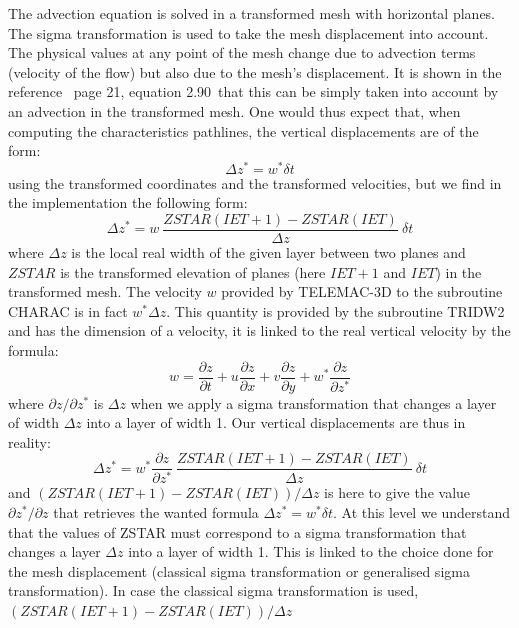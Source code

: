 The advection equation is solved in a transformed mesh with horizontal planes. The sigma
transformation is used to take the mesh displacement into account. 
The physical values at any point of the mesh change due to
advection terms (velocity of the flow) but also due to the mesh's displacement.
It is shown in the reference \cite{hervouet007}\ page 21, equation 2.90\ that this can
be simply taken into account by an advection in the transformed mesh. One
would thus expect that, when computing the characteristics pathlines,
the vertical displacements are of the form:%
\begin{equation}
\Delta z^{\ast}=w^{\ast}\delta t
\end{equation}
using the transformed coordinates and the transformed velocities, but we find
in the implementation the following form:
\begin{equation}
\Delta z^{\ast}=w~\dfrac{ZSTAR(IET+1)-ZSTAR(IET)}{\Delta z}~\delta t
\end{equation}
where $\Delta z$ is the local real width of the given layer between two planes
and $ZSTAR$ is the transformed elevation of planes (here $IET+1$ and $IET$) in
the transformed mesh.
The velocity $w$ provided by TELEMAC-3D to the subroutine CHARAC is in
fact $w^{\ast}\Delta z$. This quantity is provided by the subroutine
TRIDW2 and has the dimension of a velocity, it is linked to the real vertical
velocity by the formula:%
\begin{equation}
w=\dfrac{\partial z}{\partial t}+u\dfrac{\partial z}{\partial x}+v\dfrac{\partial
z}{\partial y}+w^{\ast}\dfrac{\partial z}{\partial z^{\ast}}%
\end{equation}
where $\partial z/\partial z^{\ast}$ is $\Delta z$ when we apply a
sigma transformation that changes a layer of width $\Delta z$ into a layer of
width 1. Our vertical displacements are thus in reality:%
\begin{equation}
\Delta z^{\ast}=w^{\ast}\dfrac{\partial z}{\partial z^{\ast}}~\dfrac
{ZSTAR(IET+1)-ZSTAR(IET)}{\Delta z}~\delta t
\end{equation}
and $(ZSTAR(IET+1)-ZSTAR(IET))/\Delta z$ is here to give the value
$\partial z^{\ast}/\partial z$ that retrieves the wanted formula
$\Delta z^{\ast}=w^{\ast}\delta t$. At this level we understand that the
values of ZSTAR must correspond to a sigma transformation that changes a layer
$\Delta z$ into a layer of width 1. This is linked to the choice done for the
mesh displacement (classical sigma transformation or generalised sigma transformation).
In case the classical sigma transformation is used, $(ZSTAR(IET+1)-ZSTAR(IET))/\Delta z$
